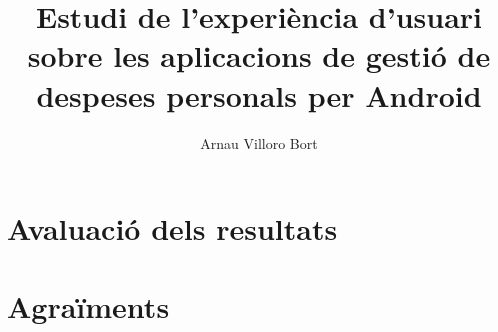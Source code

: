 \documentclass{book}
\title{Estudi de l'experiència d'usuari sobre les aplicacions de gestió de despeses personals per Android}
\author{Arnau Villoro Bort}
\begin{document}
\newcommand{\blueA}{\cellcolor{blue_table_1}}
\newcommand{\blueB}{\cellcolor{blue_table_2}}
\newcommand{\blueC}{\cellcolor{blue_table_3}}
\newcommand{\headA}[1]{\multicolumn{1}{|c|}{\blueA \textbf{#1}}}
\newcommand{\headB}[1]{\multicolumn{1}{|c|}{\blueB \textbf{#1}}}
\newcommand{\headC}[1]{\multicolumn{1}{|c|}{\blueC \textbf{#1}}}
\newcommand{\noBorde}[1]{\multicolumn{1}{#1}{}}


\frontmatter






\tableofcontents





\mainmatter






\chapter{Avaluació dels resultats}







\chapter{Agraïments}


\end{document}

